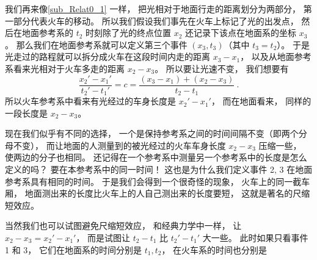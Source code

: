 我们再来像\autoref{sub_Relat0_1} 一样， 把光相对于地面行走的距离划分为两部分， 第一部分代表火车的移动。 所以我们假设我们事先在火车上标记了光的出发点， 然后在地面参考系的 $t_2$ 时刻除了光的终点位置 $x_2$ 还记录下该点在地面系的坐标 $x_3$。 那么我们在地面参考系就可以定义第三个事件 $(x_3, t_3)$（其中 $t_3 = t_2$）。 于是光走过的路程就可以拆分成火车在这段时间内走的距离 $x_3 - x_1$， 以及从地面参考系看来光相对于火车多走的距离 $x_2 - x_3$。 所以要让光速不变， 我们想要有
\begin{equation}
\frac{x_2' - x_1'}{t_2' - t_1'} = c = \frac{(x_3 - x_1) + (x_2 - x_3)}{t_2 - t_1}~.
\end{equation}
所以火车参考系中看来有光经过的车身长度是 $x_2' - x_1'$， 而在地面看来， 同样的一段长度是 $x_2 - x_3$。

现在我们似乎有不同的选择， 一个是保持参考系之间的时间间隔不变（即两个分母不变）， 而让地面的人测量到的被光经过的火车车身长度 $x_2 - x_3$ 压缩一些， 使两边的分子也相同。 还记得在一个参考系中测量另一个参考系中的长度是怎么定义的吗？ 要在本参考系中的同一时间！ 这也是为什么我们定义事件 2, 3 在地面参考系具有相同的时间。 于是我们会得到一个很奇怪的现象， 火车上的同一截车厢， 地面测出来的长度比火车上的人自己测出来的长度要短， 这就是著名的尺缩短效应。

当然我们也可以试图避免尺缩短效应， 和经典力学中一样， 让 $x_2 - x_3 = x_2' - x_1'$， 而是试图让 $t_2 - t_1$ 比 $t_2' - t_1'$ 大一些。 此时如果只看事件 1 和 3， 它们在地面系的时间分别是 $t_1, t_2$， 在火车系的时间也分别是

